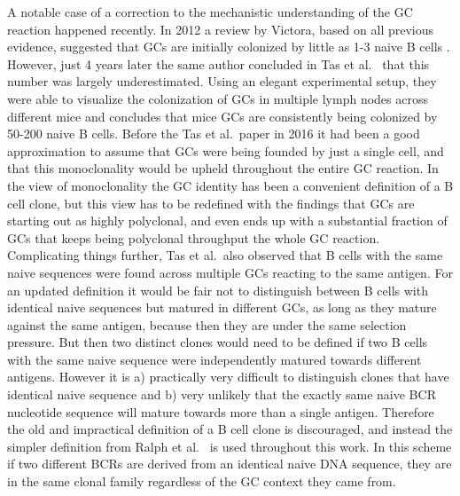 A notable case of a correction to the mechanistic understanding of the GC reaction happened recently.
In 2012 a review by Victora, based on all previous evidence, suggested that GCs are initially colonized by little as 1-3 naive B cells \cite{victora2012germinal}.
However, just 4 years later the same author concluded in Tas et al.\ \cite{tas2016visualizing} that this number was largely underestimated.
Using an elegant experimental setup, they were able to visualize the colonization of GCs in multiple lymph nodes across different mice and concludes that mice GCs are consistently being colonized by 50-200 naive B cells.
Before the Tas et al.\ paper in 2016 it had been a good approximation to assume that GCs were being founded by just a single cell, and that this monoclonality would be upheld throughout the entire GC reaction.
In the view of monoclonality the GC identity has been a convenient definition of a B cell clone, but this view has to be redefined with the findings that GCs are starting out as highly polyclonal, and even ends up with a substantial fraction of GCs that keeps being polyclonal throughput the whole GC reaction.
Complicating things further, Tas et al.\ also observed that B cells with the same naive sequences were found across multiple GCs reacting to the same antigen.
For an updated definition it would be fair not to distinguish between B cells with identical naive sequences but matured in different GCs, as long as they mature against the same antigen, because then they are under the same selection pressure.
But then two distinct clones would need to be defined if two B cells with the same naive sequence were independently matured towards different antigens.
However it is a) practically very difficult to distinguish clones that have identical naive sequence and b) very unlikely that the exactly same naive BCR nucleotide sequence will mature towards more than a single antigen.
Therefore the old and impractical definition of a B cell clone is discouraged, and instead the simpler definition from Ralph et al.\ \cite{ralph2016likelihood} is used throughout this work.
In this scheme if two different BCRs are derived from an identical naive DNA sequence, they are in the same clonal family regardless of the GC context they came from.

